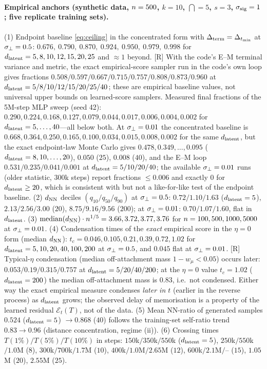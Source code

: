 \paragraph{Empirical anchors (synthetic data, $n=500$, $k=10$, $\dint=5$, $s=3$, $\sigma_{\mathrm{sig}}=1$; five replicate training sets).}
(1) Endpoint baseline \eqref{eq:ceiling} in the concentrated form with $\Delta_{\rm term}=\Delta_{t_{\min}}$ at $\sigma_{\perp}=0.5$: $0.676,\ 0.790,\ 0.870,\ 0.924,\ 0.950,\ 0.979,\ 0.998$ for $d_{\mathrm{latent}}=5,8,10,12,15,20,25$ and $\approx1$ beyond. [R] With the code's E--M terminal variance and metric, the exact empirical-score sampler run in the code's own loop gives fractions $0.508/0.597/0.667/0.715/0.757/0.808/0.873/0.960$ at $d_{\mathrm{latent}}=5/8/10/12/15/20/25/40$; these are empirical baseline values, not universal upper bounds on learned-score samplers. Measured final fractions of the 5M-step MLP sweep (seed 42): $0.290,0.224,0.168,0.127,0.079,0.044,0.017,0.006,0.004,0.002$ for $d_{\mathrm{latent}}=5,\dots,40$---all below both. At $\sigma_{\perp}=0.01$ the concentrated baseline is $0.668,0.364,0.250,0.165,0.100,0.034,0.015,0.008,0.002$ for the same $d_{\mathrm{latent}}$, but the exact endpoint-law Monte Carlo gives $0.478,0.349,\dots,0.095$ ($d_{\mathrm{latent}}=8,10,\dots,20$), $0.050$ ($25$), $0.008$ ($40$), and the E--M loop $0.531/0.235/0.041/0.001$ at $d_{\mathrm{latent}}=5/10/20/40$; the available $\sigma_{\perp}=0.01$ runs (older statistic, $300$k steps) report fractions $\le0.006$ and exactly $0$ for $d_{\mathrm{latent}}\ge20$, which is consistent with but not a like-for-like test of the endpoint baseline. (2) $d_{\rm NN}$ deciles $(q_{10}/q_{50}/q_{90})$ at $\sigma_{\perp}=0.5$: $0.72/1.10/1.63$ ($d_{\mathrm{latent}}=5$), $2.13/2.56/3.00$ ($20$), $8.75/9.16/9.56$ ($200$); at $\sigma_{\perp}=0.01$: $0.70/1.07/1.60$, flat in $d_{\mathrm{latent}}$. (3) $\mathrm{median}(d_{\rm NN})\cdot n^{1/5}=3.66,3.72,3.77,3.76$ for $n=100,500,1000,5000$ at $\sigma_{\perp}=0.01$. (4) Condensation times of the \emph{exact} empirical score in the $\eta=0$ form (median $d_{\rm NN}$): $t_c=0.046,0.105,0.21,0.39,0.72,1.02$ for $d_{\mathrm{latent}}=5,10,20,40,100,200$ at $\sigma_{\perp}=0.5$, and $0.045$ flat at $\sigma_{\perp}=0.01$. [R] Typical-$\eta$ condensation (median off-attachment mass $1-w_\mu<0.05$) occurs later: $0.053/0.19/0.315/0.757$ at $d_{\mathrm{latent}}=5/20/40/200$; at the $\eta=0$ value $t_c=1.02$ ($d_{\mathrm{latent}}=200$) the median off-attachment mass is $0.83$, i.e.\ not condensed. Either way the exact empirical measure condenses \emph{later in $t$} (earlier in the reverse process) as $d_{\mathrm{latent}}$ grows; the observed delay of memorisation is a property of the learned residual $\mathcal E_t(T)$, not of the data. (5) Mean NN-ratio of generated samples $0.524$ ($d_{\mathrm{latent}}=5$) $\to0.868$ ($40$) follows the training-set self-ratio trend $0.83\to0.96$ (distance concentration, regime (ii)). (6) Crossing times $T(1\%)/T(5\%)/T(10\%)$ in steps: $150$k$/350$k$/550$k ($d_{\mathrm{latent}}=5$), $250$k$/550$k$/1.0$M ($8$), $300$k$/700$k$/1.7$M ($10$), $400$k$/1.0$M$/2.65$M ($12$), $600$k$/2.1$M$/$-- ($15$), $1.05$M ($20$), $2.55$M ($25$).

